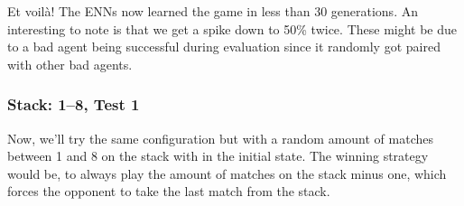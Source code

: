 \documentclass[11pt]{report}
\begin{document}
\begin{enumerate}
\begin{center}
    \end{center}
    Et voilà!
    The ENNs now learned the game in less than 30 generations.
    An interesting to note is that we get a spike down to 50\% twice.
    These might be due to a bad agent being successful during evaluation since it randomly got paired with other bad agents.
                \subsubsection{Stack: 1--8, Test 1}
    Now, we'll try the same configuration but with a random amount of matches between 1 and 8 on the stack with in the initial state.
    The winning strategy would be, to always play the amount of matches on the stack minus one, which forces the opponent to take the last match from the stack.
    \renewcommand{\csvpath}{../data/simple_nim/stack_8r/t_1/stats.csv} %
    \begin{center}
\end{center}
\end{enumerate}
\end{document}
